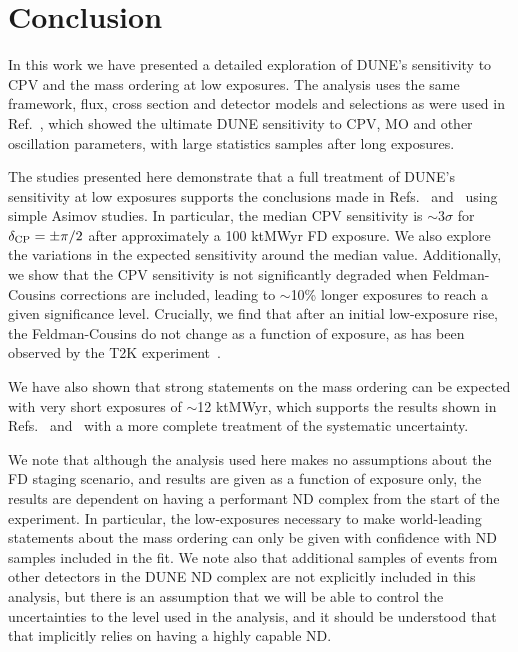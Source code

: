 \section{Conclusion}
\label{sec:conclude}

In this work we have presented a detailed exploration of DUNE's sensitivity to CPV and the mass ordering at low exposures. The analysis uses the same framework, flux, cross section and detector models and selections as were used in Ref.~\cite{Abi:2020qib}, which showed the ultimate DUNE sensitivity to CPV, MO and other oscillation parameters, with large statistics samples after long exposures.


The studies presented here demonstrate that a full treatment of DUNE's sensitivity at low exposures supports the conclusions made in Refs.~\cite{Abi:2020qib} and~\cite{Abi:2020evt} using simple Asimov studies. In particular, the median CPV sensitivity is $\sim$3$\sigma$ for $\delta_{\rm CP} = \pm\pi/2$ after approximately a 100 ktMWyr FD exposure. We also explore the variations in the expected sensitivity around the median value. Additionally, we show that the CPV sensitivity is not significantly degraded when Feldman-Cousins corrections are included, leading to $\sim$10\% longer exposures to reach a given significance level. Crucially, we find that after an initial low-exposure rise, the Feldman-Cousins \dchisqcrit do not change as a function of exposure, as has been observed by the T2K experiment~\cite{Abe:2021gky}.

We have also shown that strong statements on the mass ordering can be expected with very short exposures of $\sim$12 ktMWyr, which supports the results shown in Refs.~\cite{Abi:2020qib} and~\cite{Abi:2020evt} with a more complete treatment of the systematic uncertainty.

We note that although the analysis used here makes no assumptions about the FD staging scenario, and results are given as a function of exposure only, the results are dependent on having a performant ND complex from the start of the experiment. In particular, the low-exposures necessary to make world-leading statements about the mass ordering can only be given with confidence with ND samples included in the fit. We note also that additional samples of events from other detectors in the DUNE ND complex are not explicitly included in this analysis, but there is an assumption that we will be able to control the uncertainties to the level used in the analysis, and it should be understood that that implicitly relies on having a highly capable ND.
